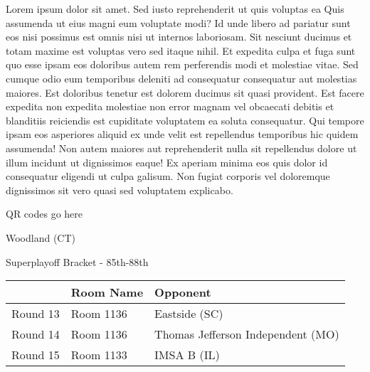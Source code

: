 \documentclass{article}%
\begin{document}
\vspace*{8pt}%
\linebreak%
\newline%
\newline%
Lorem ipsum dolor sit amet. Sed iusto reprehenderit ut quis voluptas ea Quis assumenda ut eius magni eum voluptate modi? Id unde libero ad pariatur sunt eos nisi possimus est omnis nisi ut internos laboriosam. Sit nesciunt ducimus et totam maxime est voluptas vero sed itaque nihil. Et expedita culpa et fuga sunt quo esse ipsam eos doloribus autem rem perferendis modi et molestiae vitae.\newline%
\newline%
Sed cumque odio eum temporibus deleniti ad consequatur consequatur aut molestias maiores. Est doloribus tenetur est dolorem ducimus sit quasi provident. Est facere expedita non expedita molestiae non error magnam vel obcaecati debitis et blanditiis reiciendis est cupiditate voluptatem ea soluta consequatur. Qui tempore ipsam eos asperiores aliquid ex unde velit est repellendus temporibus hic quidem assumenda!\newline%
\newline%
Non autem maiores aut reprehenderit nulla sit repellendus dolore ut illum incidunt ut dignissimos eaque! Ex aperiam minima eos quis dolor id consequatur eligendi ut culpa galisum. Non fugiat corporis vel doloremque dignissimos sit vero quasi sed voluptatem explicabo.\newline%
\newline%
%
\vspace*{30pt}%
\begin{center}%
\begin{Huge}%
QR codes go here%
\end{Huge}%
\end{center}%
\newpage%
\begin{center}%
\begin{Huge}%
Woodland (CT)%
\end{Huge}%
\vspace*{8pt}%
\linebreak%
\begin{Large}%
Superplayoff Bracket {-} 85th{-}88th%
\end{Large}%
\end{center}%
%
\begin{tabularx}{\textwidth}{|c|Y|Y|}%
\hline%
&Room Name&Opponent\\%
\hline%
Round 13&Room 1136&Eastside (SC)\\%
Round 14&Room 1136&Thomas Jefferson Independent (MO)\\%
Round 15&Room 1133&IMSA B (IL)\\%
\hline%
\end{tabularx}%
\end{document}
